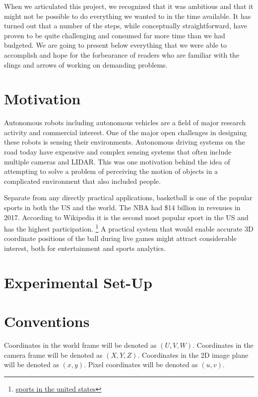 \documentclass{article}
\begin{document}
When we articulated this project, we recognized that it was ambitious and that it might not be possible to do everything we wanted to
in the time available.  It has turned out that a number of the steps, while conceptually straightforward, have proven to be quite
challenging and consumed far more time than we had budgeted.  We are going to present below everything that we were able
to accomplish and hope for the forbearance of readers who are familiar with the slings and arrows of working on demanding problems.

\section{Motivation}
Autonomous robots including autonomous vehicles are a field of major research activity and commercial interest.
One of the major open challenges in designing these robots is sensing their environments.
Autonomous driving systems on the road today have expensive and complex sensing systems
that often include multiple cameras and LIDAR.
This was one motivation behind the idea of attempting to solve a problem of perceiving the motion
of objects in a complicated environment that also included people.

Separate from any directly practical applications, basketball is one of the popular sports in both the US and the world.
The NBA had \$14 billion in revenues in 2017.  According to Wikipedia  it is the second most popular sport in the US
and has the highest participation.   
\footnote{\href{https://en.wikipedia.org/wiki/Sports_in_the_United_States}{sports in the united states}}
A practical system that would enable accurate 3D coordinate positions of the ball during live games might
attract considerable interest, both for entertainment and sports analytics.

\section{Experimental Set-Up}


\section{Conventions}
Coordinates in the world frame will be denoted as $(U, V, W)$. Coordinates in the camera frame will be denoted as $(X, Y, Z)$. Coordinates in the 2D image plane will be denoted as $(x, y)$. Pixel coordinates will be denoted as $(u, v)$. \\
\end{document}

